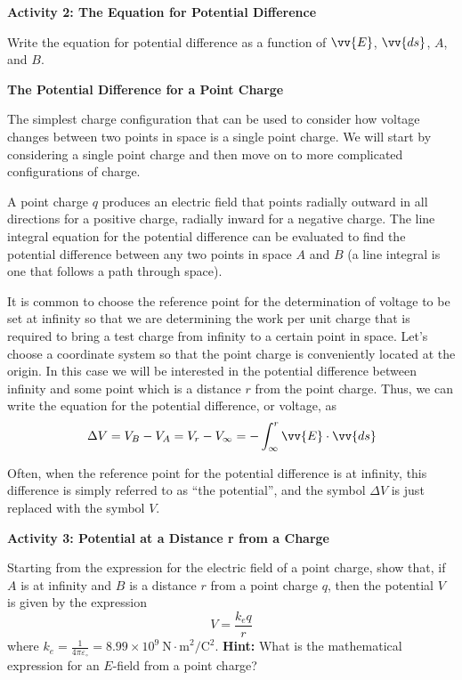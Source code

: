 \textbf{Activity 2: The Equation for Potential Difference}

Write the equation for potential difference as a function of $\vv{E}$,
$\vv{ds}$, $A$, and $B$.
\answerspace{15mm}

\textbf{The Potential Difference for a Point Charge}

The simplest charge configuration that can be used to consider how
voltage changes between two points in space is a single point charge.
We will start by considering a single point charge and then move on
to more complicated configurations of charge.

A point charge $q$ produces an electric field that points radially outward
in all directions for a positive charge, radially inward for a negative charge. The line integral equation for the potential difference
can be evaluated to find the potential difference between any two
points in space $A$ and $B$ (a line integral is one that follows a path
through space).

It is common to choose the reference point for the determination of
voltage to be set at infinity so that we are determining the work
per unit charge that is required to bring a test charge from infinity
to a certain point in space. Let's choose a coordinate system so that
the point charge is conveniently located at the origin. In this case
we will be interested in the potential difference between infinity
and some point which is a distance $r$ from the point charge. Thus,
we can write the equation for the potential difference, or voltage,
as
\begin{equation*}
\Delta V=V_{B}-V_{A}=V_{r}-V_{\infty }=-\int ^{r}_{\infty} \vv{E}\cdot \vv{ds}
\end{equation*}

Often, when the reference point for the potential difference is at
infinity, this difference is simply referred to as ``the potential'',
and the symbol $\Delta V$ is just replaced with the symbol $V$.

\pagebreak[2]
\textbf{Activity 3: Potential at a Distance r from a Charge}

Starting from the expression for the electric field of a point charge,
show that, if $A$ is at infinity and $B$ is a distance $r$ from a point
charge $q$, then the potential $V$ is given by the expression
\begin{equation*}
V=\frac{k_eq}{r}
\end{equation*}
where $k_e=\frac{1}{4\pi \varepsilon _{\circ }} = 8.99 \times 10^{9} \ \mathrm{N\cdot m}^2
/ \mathrm{C}^2 .$
\textbf{Hint:} What is the mathematical expression for an $E$-field
from a point charge?


